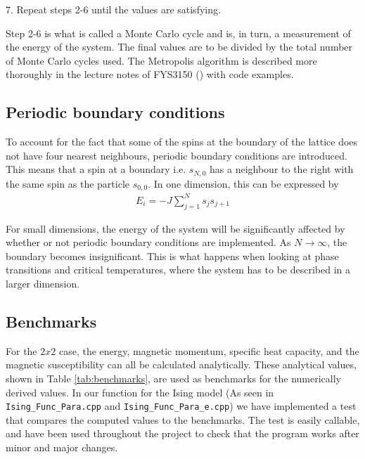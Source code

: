 \documentclass[12pt,english,a4paper]{article}
\begin{document}
7. Repeat steps 2-6 until the values are satisfying.


\noindent Step 2-6 is what is called a Monte Carlo cycle and is, in turn, a measurement of the energy of the system. The final values are to be divided by the total number of Monte Carlo cycles used. The Metropolis algorithm is described more thoroughly in the lecture notes of FYS3150 (\cite{LectureIsing}) with code examples.

\subsection{Periodic boundary conditions}
To account for the fact that some of the spins at the boundary of the lattice does not have four nearest neighbours, periodic boundary conditions are introduced. This means that a spin at a boundary i.e. $s_{N,0}$ has a neighbour to the right with the same spin as the particle $s_{0,0}$. In one dimension, this can be expressed by
\begin{align*}
    E_i=-J\sum_{j=1}^{N}s_js_{j+1}
\end{align*}

\noindent For small dimensions, the energy of the system will be significantly affected by whether or not periodic boundary conditions are implemented. As $N \rightarrow \infty$, the boundary becomes insignificant. This is what happens when looking at phase transitions and critical temperatures, where the system has to be described in a larger dimension.

\subsection{Benchmarks}

For the $2x2$ case, the energy, magnetic momentum, specific heat capacity, and the magnetic susceptibility can all be calculated analytically. These analytical values, shown in Table \ref{tab:benchmarks}, are used as benchmarks for the numerically derived values. In our function for the Ising model (As seen in \texttt{Ising\_Func\_Para.cpp} and \texttt{Ising\_Func\_Para\_e.cpp}) we have implemented a test that compares the computed values to the benchmarks. The test is easily callable, and have been used throughout the project to check that the program works after  minor and major changes. 
\end{document}
